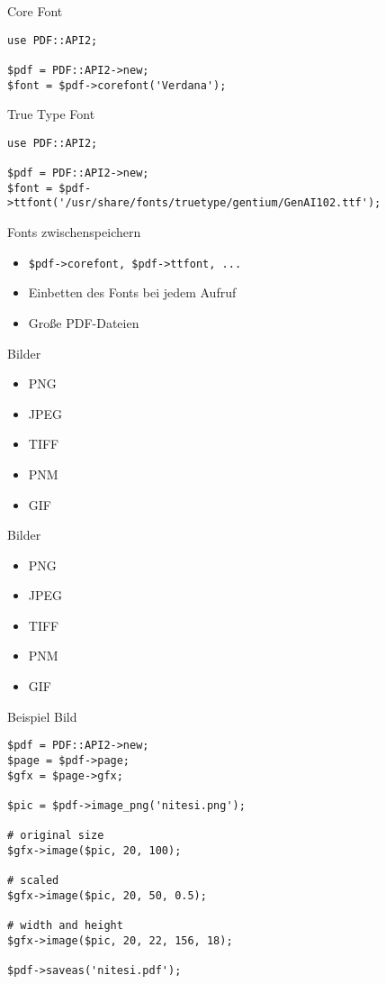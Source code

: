 \begin{frame}[fragile]{Core Font}
\begin{lstlisting}
use PDF::API2;

$pdf = PDF::API2->new;
$font = $pdf->corefont('Verdana');
\end{lstlisting}
\end{frame}


\begin{frame}[fragile]{True Type Font}
\begin{lstlisting}
use PDF::API2;

$pdf = PDF::API2->new;
$font = $pdf->ttfont('/usr/share/fonts/truetype/gentium/GenAI102.ttf');
\end{lstlisting}
\end{frame}

\begin{frame}[fragile]{Fonts zwischenspeichern}
\begin{itemize}
\item \begin{verbatim}$pdf->corefont, $pdf->ttfont, ... \end{verbatim} 
\item Einbetten des Fonts bei jedem Aufruf
\item Große PDF-Dateien
\end{itemize}
\end{frame}

\begin{frame}{Bilder}
\begin{itemize}
\item PNG
\item JPEG
\item TIFF
\item PNM
\item GIF
\end{itemize}
\end{frame}

\begin{frame}{Bilder}
\begin{itemize}
\item PNG
\item JPEG
\item TIFF
\item PNM
\item GIF
\end{itemize}
\end{frame}

\begin{frame}[fragile]{Beispiel Bild}
\begin{lstlisting}
$pdf = PDF::API2->new;
$page = $pdf->page;
$gfx = $page->gfx;

$pic = $pdf->image_png('nitesi.png');

# original size
$gfx->image($pic, 20, 100);

# scaled
$gfx->image($pic, 20, 50, 0.5);

# width and height
$gfx->image($pic, 20, 22, 156, 18);

$pdf->saveas('nitesi.pdf');
\end{lstlisting}
\end{frame}

